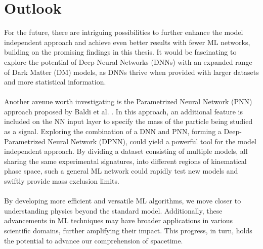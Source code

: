 \documentclass[12pt, a4paper]{book}
\begin{document}
\section{Outlook}
For the future, there are intriguing possibilities to further enhance the model independent approach and achieve even better results with fewer ML networks, building on the promising findings in this thesis. It would be fascinating to explore the potential of Deep Neural Networks (DNNs) 
with an expanded range of Dark Matter (DM) models, as DNNs thrive when provided with larger datasets and more statistical information.\\
\\Another avenue worth investigating is the Parametrized Neural Network (PNN) approach proposed by Baldi et al. \cite{Baldi_2016}. In this approach, an additional feature is included on the NN input layer to specify the mass of the particle being studied as a signal. 
Exploring the combination of a DNN and PNN, forming a Deep-Parametrized Neural Network (DPNN), could yield a powerful tool for the model independent approach. By dividing a dataset consisting of multiple models, all sharing the same experimental signatures, into different regions of kinematical phase space, 
such a general ML network could rapidly test new models and swiftly provide mass exclusion limits.\\
\\By developing more efficient and versatile ML algorithms, we move closer to understanding physics beyond the standard model. Additionally, these advancements in ML techniques may have broader applications in various scientific domains, further amplifying their impact.
This progress, in turn, holds the potential to advance our comprehension of spacetime.

\end{document}
